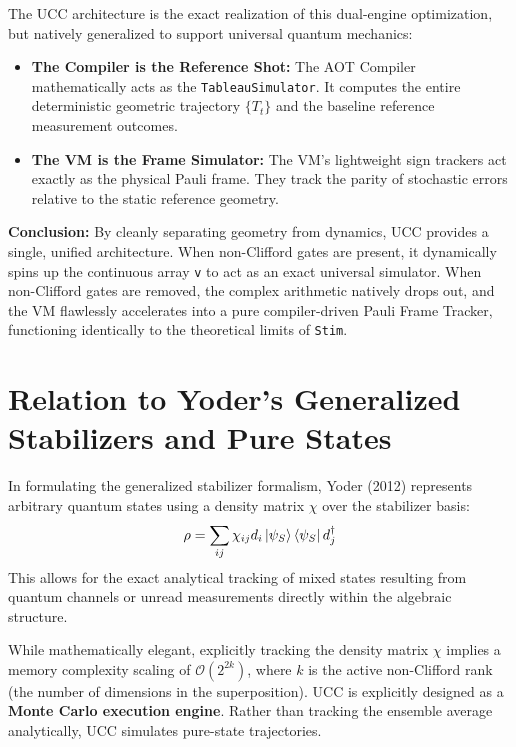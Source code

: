 \documentclass[11pt]{article}
\begin{document}
The UCC architecture is the exact realization of this dual-engine optimization, but natively generalized to support universal quantum mechanics:
\begin{itemize}
    \item \textbf{The Compiler is the Reference Shot:} The AOT Compiler mathematically acts as the \texttt{TableauSimulator}. It computes the entire deterministic geometric trajectory $\{T_t\}$ and the baseline reference measurement outcomes.
    \item \textbf{The VM is the Frame Simulator:} The VM's lightweight sign trackers act exactly as the physical Pauli frame. They track the parity of stochastic errors relative to the static reference geometry.
\end{itemize}

\textbf{Conclusion:}
By cleanly separating geometry from dynamics, UCC provides a single, unified architecture. When non-Clifford gates are present, it dynamically spins up the continuous array \texttt{v} to act as an exact universal simulator. When non-Clifford gates are removed, the complex arithmetic natively drops out, and the VM flawlessly accelerates into a pure compiler-driven Pauli Frame Tracker, functioning identically to the theoretical limits of \texttt{Stim}.

\newpage
\section{Relation to Yoder's Generalized Stabilizers and Pure States}
\label{app:yoder}

In formulating the generalized stabilizer formalism, Yoder (2012) represents arbitrary quantum states using a density matrix $\chi$ over the stabilizer basis:
\begin{equation}
\rho = \sum_{ij} \chi_{ij} d_i \ket{\psi_S}\bra{\psi_S} d_j^\dagger
\end{equation}
This allows for the exact analytical tracking of mixed states resulting from quantum channels or unread measurements directly within the algebraic structure.

While mathematically elegant, explicitly tracking the density matrix $\chi$ implies a memory complexity scaling of $\mathcal{O}(2^{2k})$, where $k$ is the active non-Clifford rank (the number of dimensions in the superposition). UCC is explicitly designed as a \textbf{Monte Carlo execution engine}. Rather than tracking the ensemble average analytically, UCC simulates pure-state trajectories.
\end{document}
